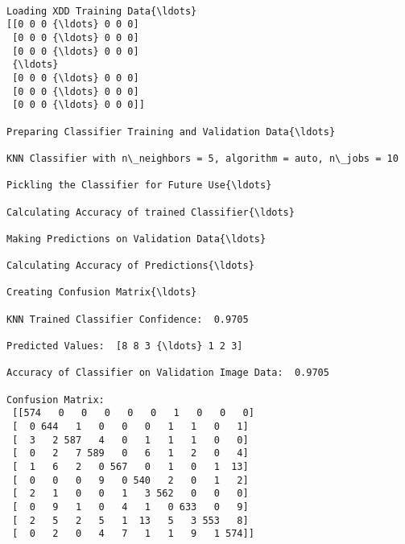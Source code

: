 \documentclass[11pt]{article}
\begin{document}
    \begin{Verbatim}[commandchars=\\\{\}]

Loading XDD Training Data{\ldots}
[[0 0 0 {\ldots} 0 0 0]
 [0 0 0 {\ldots} 0 0 0]
 [0 0 0 {\ldots} 0 0 0]
 {\ldots}
 [0 0 0 {\ldots} 0 0 0]
 [0 0 0 {\ldots} 0 0 0]
 [0 0 0 {\ldots} 0 0 0]]

Preparing Classifier Training and Validation Data{\ldots}

KNN Classifier with n\_neighbors = 5, algorithm = auto, n\_jobs = 10

Pickling the Classifier for Future Use{\ldots}

Calculating Accuracy of trained Classifier{\ldots}

Making Predictions on Validation Data{\ldots}

Calculating Accuracy of Predictions{\ldots}

Creating Confusion Matrix{\ldots}

KNN Trained Classifier Confidence:  0.9705

Predicted Values:  [8 8 3 {\ldots} 1 2 3]

Accuracy of Classifier on Validation Image Data:  0.9705

Confusion Matrix: 
 [[574   0   0   0   0   0   1   0   0   0]
 [  0 644   1   0   0   0   1   1   0   1]
 [  3   2 587   4   0   1   1   1   0   0]
 [  0   2   7 589   0   6   1   2   0   4]
 [  1   6   2   0 567   0   1   0   1  13]
 [  0   0   0   9   0 540   2   0   1   2]
 [  2   1   0   0   1   3 562   0   0   0]
 [  0   9   1   0   4   1   0 633   0   9]
 [  2   5   2   5   1  13   5   3 553   8]
 [  0   2   0   4   7   1   1   9   1 574]]

    \end{Verbatim}

    \begin{center}
    \end{center}
    { \hspace*{\fill} \\}
    
\end{document}
